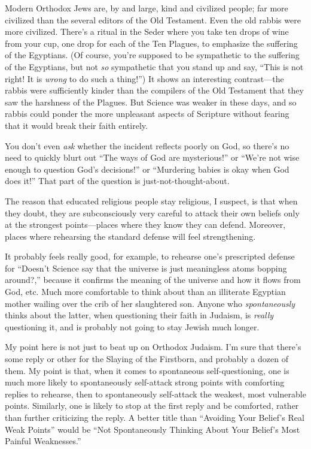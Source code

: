 {
 Modern Orthodox Jews are, by and large, kind and civilized people;
far more civilized than the several editors of the Old Testament. Even
the old rabbis were more civilized. There's a ritual in
the Seder where you take ten drops of wine from your cup, one drop for
each of the Ten Plagues, to emphasize the suffering of the Egyptians.
(Of course, you're supposed to be sympathetic to the
suffering of the Egyptians, but not \textit{so} sympathetic that you
stand up and say, ``This is not right! It is
\textit{wrong} to do such a thing!'') It shows an
interesting contrast---the rabbis were sufficiently kinder than the
compilers of the Old Testament that they saw the harshness of the
Plagues. But Science was weaker in these days, and so rabbis could
ponder the more unpleasant aspects of Scripture without fearing that it
would break their faith entirely.}

{
 You don't even \textit{ask} whether the incident
reflects poorly on God, so there's no need to quickly
blurt out ``The ways of God are
mysterious!'' or
``We're not wise enough to question
God's decisions!'' or
``Murdering babies is okay when God does
it!'' That part of the question is
just-not-thought-about.}

{
 The reason that educated religious people stay religious, I
suspect, is that when they doubt, they are subconsciously very careful
to attack their own beliefs only at the strongest points---places where
they know they can defend. Moreover, places where rehearsing the
standard defense will feel strengthening.}

{
 It probably feels really good, for example, to rehearse
one's prescripted defense for
``Doesn't Science say that the
universe is just meaningless atoms bopping around?,''
because it confirms the meaning of the universe and how it flows from
God, etc. Much more comfortable to think about than an illiterate
Egyptian mother wailing over the crib of her slaughtered son. Anyone
who \textit{spontaneously} thinks about the latter, when questioning
their faith in Judaism, is \textit{really} questioning it, and is
probably not going to stay Jewish much longer.}

{
 My point here is not just to beat up on Orthodox Judaism.
I'm sure that there's some reply or
other for the Slaying of the Firstborn, and probably a dozen of them.
My point is that, when it comes to spontaneous self-questioning, one is
much more likely to spontaneously self-attack strong points with
comforting replies to rehearse, then to spontaneously self-attack the
weakest, most vulnerable points. Similarly, one is likely to stop at
the first reply and be comforted, rather than further criticizing the
reply. A better title than ``Avoiding Your
Belief's Real Weak Points'' would be
``Not Spontaneously Thinking About Your
Belief's Most Painful Weaknesses.''}

